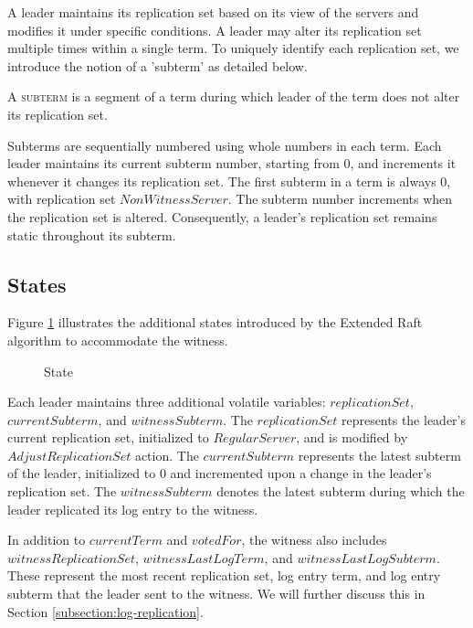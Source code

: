 A leader maintains its replication set based on its view of the servers and modifies it under specific conditions. A leader may alter its replication set multiple times within a single term. To uniquely identify each replication set, we introduce the notion of a 'subterm' as detailed below.

\begin{definition} 
    A \textsc{subterm} is a segment of a term during which leader of the term does not alter its replication set.
\end{definition}

Subterms are sequentially numbered using whole numbers in each term. Each leader maintains its current subterm number, starting from $0$, and increments it whenever it changes its replication set.
The first subterm in a term is always $0$, with replication set $NonWitnessServer$. The subterm number increments when the replication set is altered. Consequently, a leader's replication set remains static throughout its subterm.


\subsection{States}\label{subsection:states}

Figure \ref{fig:algo-state} illustrates the additional states introduced by the Extended Raft algorithm to accommodate the witness.
\begin{figure}[htbp]
    \begin{framed}
        
    \end{framed}
    \caption{State}
    \label{fig:algo-state}
\end{figure}

Each leader maintains three additional volatile variables: $replicationSet$, $currentSubterm$, and $witnessSubterm$. The $replicationSet$ represents the leader's current replication set, initialized to $RegularServer$, and is modified by $AdjustReplicationSet$ action. The $currentSubterm$ represents the latest subterm of the leader, initialized to $0$ and incremented upon a change in the leader's replication set. The $witnessSubterm$ denotes the latest subterm during which the leader replicated its log entry to the witness.

In addition to $currentTerm$ and $votedFor$, the witness also includes $witnessReplicationSet$, $witnessLastLogTerm$, and $witnessLastLogSubterm$. These represent the most recent replication set, log entry term, and log entry subterm that the leader sent to the witness. We will further discuss this in Section \ref{subsection:log-replication}.

